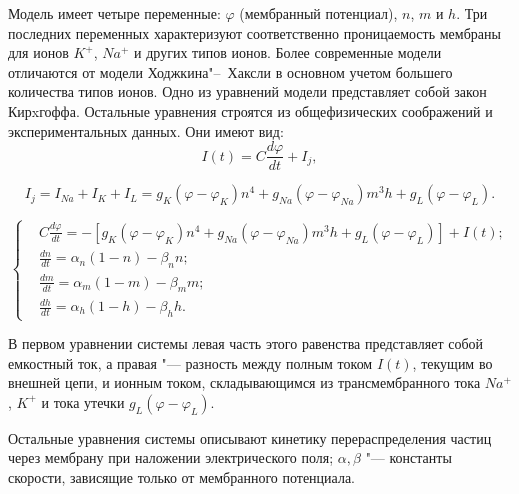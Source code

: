 \documentclass[12pt,a4paper,oneside]{book}
\begin{document}
Модель имеет четыре переменные: $\varphi$ (мембранный потенциал), $n$, $m$ и $h$. Три последних переменных характеризуют соответственно проницаемость мембраны для ионов $K^+$, $Na^+$ и других типов ионов. Более современные модели отличаются от модели Ходжкина"--~Хаксли в основном учетом большего количества типов ионов. Одно из уравнений модели представляет собой закон Кирxгоффа. Остальные уравнения строятся из общефизических соображений и экспериментальных данных. Они имеют вид:
\begin{equation}
	I(t) = C \frac{d \varphi}{dt} + I_j,
\end{equation}

\begin{equation}
	I_j=I_{Na}+I_K+I_L=g_K(\varphi-\varphi_K)n^4+g_{Na}	(\varphi-\varphi_{Na})m^3h+g_L(\varphi-\varphi_L).
\end{equation}

\begin{equation}
\left\{
	\begin{aligned}
	& C \frac{d \varphi}{dt}=-[g_K(\varphi-\varphi_K)n^4+g_{Na}(\varphi-\varphi_{Na})m^3h+g_L(\varphi-\varphi_L)]+I(t);\\
	& \frac{dn}{dt}=\alpha_n(1-n)-\beta_n n; \\
	& \frac{dm}{dt}=\alpha_m(1-m)-\beta_m m; \\
	& \frac{dh}{dt}=\alpha_h(1-h)-\beta_h h. 
	\end{aligned}
\right.
\end{equation}

В первом уравнении системы левая часть этого равенства представляет собой емкостный ток, а правая "--- разность между полным током $I(t)$, текущим во внешней цепи, и ионным током, складывающимся из трансмембранного тока $Na^+$, $K^+$ и тока утечки $g_L(\varphi - \varphi_L)$. 

Остальные уравнения системы описывают кинетику перераспределения частиц через мембрану при наложении электрического поля; $\alpha, \beta$ "--- константы скорости, зависящие только от мембранного потенциала.
\end{document}
